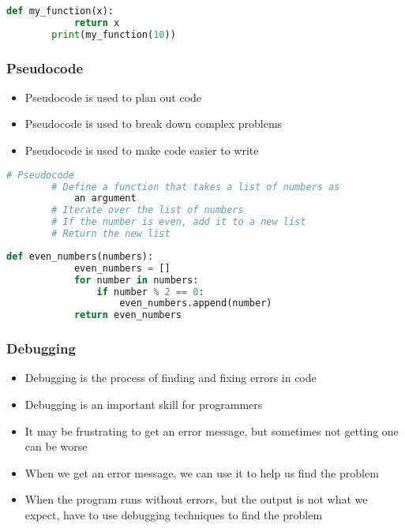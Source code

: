 \documentclass[serif, 9pt, aspectratio=32]{beamer}
\begin{document}
\begin{frame}[fragile]
    \begin{lstlisting}[language=Python]
        def my_function(x):
            return x
        print(my_function(10))
    \end{lstlisting}
\end{frame}

\begin{frame}
    \centering
    \frametitle{Pseudocode}
    \begin{itemize}
        \setlength{\itemsep}{3em}
        \item Pseudocode is used to plan out code
        \item Pseudocode is used to break down complex problems
        \item Pseudocode is used to make code easier to write
    \end{itemize}
\end{frame}

\begin{frame}[fragile]
    \begin{lstlisting}[language=Python]
        # Pseudocode
        # Define a function that takes a list of numbers as 
            an argument
        # Iterate over the list of numbers
        # If the number is even, add it to a new list
        # Return the new list
    \end{lstlisting}
\end{frame}

\begin{frame}[fragile]
    \begin{lstlisting}[language=Python]
        def even_numbers(numbers):
            even_numbers = []
            for number in numbers:
                if number % 2 == 0:
                    even_numbers.append(number)
            return even_numbers
    \end{lstlisting}
\end{frame}

\begin{frame}
    \centering
    \frametitle{Debugging}
    \begin{itemize}
        \setlength{\itemsep}{3em}
        \item Debugging is the process of finding and fixing errors in code
        \item Debugging is an important skill for programmers
        \item It may be frustrating to get an error message, but sometimes not getting one can be worse
        \item When we get an error message, we can use it to help us find the problem
        \item When the program runs without errors, but the output is not what we expect, have to use debugging techniques to find the problem
    \end{itemize}
\end{frame}
\end{document}
